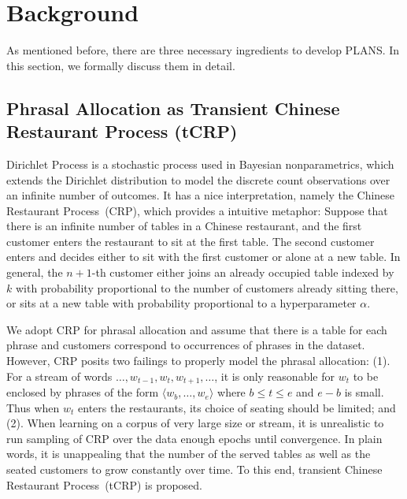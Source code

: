 \section{Background}

As mentioned before, there are three necessary ingredients to develop PLANS. In
this section, we formally discuss them in detail.

\subsection{Phrasal Allocation as Transient Chinese Restaurant Process (tCRP)}

Dirichlet Process is a stochastic process used in Bayesian nonparametrics, which
extends the Dirichlet distribution to model the discrete count observations over
an infinite number of outcomes. It has a nice interpretation, namely the Chinese
Restaurant Process~(CRP), which provides a intuitive metaphor: Suppose that
there is an infinite number of tables in a Chinese restaurant, and the first
customer enters the restaurant to sit at the first table. The second customer
enters and decides either to sit with the first customer or alone at a new
table. In general, the $n+1$-th customer either joins an already occupied table
indexed by $k$ with probability proportional to the number of customers already
sitting there, or sits at a new table with probability proportional to a
hyperparameter $\alpha$.

We adopt CRP for phrasal allocation and assume that there is a table for each
phrase and customers correspond to occurrences of phrases in the dataset.
However, CRP posits two failings to properly model the phrasal allocation: (1).
For a stream of words $\dots, w_{t-1}, w_t, w_{t+1}, \dots$, it is only
reasonable for $w_t$ to be enclosed by phrases of the form $\langle w_b, \dots,
w_e \rangle$ where $b \le t \le e$ and $e - b$ is small.  Thus when $w_t$ enters
the restaurants, its choice of seating should be limited; and (2).  When
learning on a corpus of very large size or stream, it is unrealistic to run
sampling of CRP over the data enough epochs until convergence. In plain words,
it is unappealing that the number of the served tables as well as the seated
customers to grow constantly over time. To this end, transient Chinese
Restaurant Process~(tCRP) is proposed.

